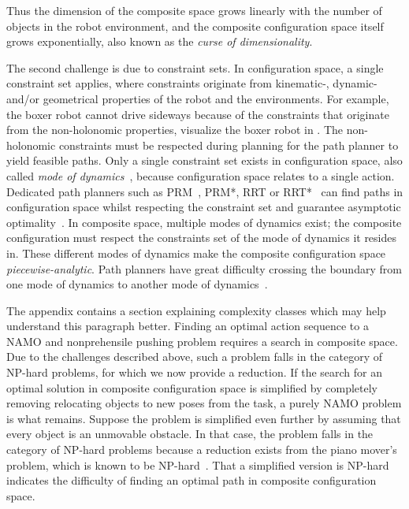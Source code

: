 Thus the dimension of the composite space grows linearly with the number of objects in the robot environment, and the composite configuration space itself grows exponentially, also known as the \textit{curse of dimensionality}.\bs

The second challenge is due to constraint sets. In configuration space, a single constraint set applies, where constraints originate from kinematic-, dynamic- and/or geometrical properties of the robot and the environments. For example, the boxer robot cannot drive sideways because of the constraints that originate from the non-holonomic properties, visualize the boxer robot in . The non-holonomic constraints must be respected during planning for the path planner to yield feasible paths. Only a single constraint set exists in configuration space, also called \textit{mode of dynamics}~\cite{hauser_multimodal_2010}, because configuration space relates to a single action. Dedicated path planners such as \ac{PRM}~\cite{hsu_path_1997}, \ac{PRM*}, \ac{RRT} or \ac{RRT*}~\cite{karaman_samplingbased_2011} can find paths in configuration space whilst respecting the constraint set and guarantee asymptotic optimality~\cite{karaman_samplingbased_2011}. In composite space, multiple modes of dynamics exist; the composite configuration must respect the constraints set of the mode of dynamics it resides in. These different modes of dynamics make the composite configuration space \textit{piecewise-analytic}. Path planners have great difficulty crossing the boundary from one mode of dynamics to another mode of dynamics~\cite{vega-brown_asymptotically_2020}.\bs

The appendix contains a section explaining complexity classes which may help understand this paragraph better. Finding an optimal action sequence to a \ac{NAMO} and nonprehensile pushing problem requires a search in composite space. Due to the challenges described above, such a problem falls in the category of \ac{NP-hard} problems, for which we now provide a reduction. If the search for an optimal solution in composite configuration space is simplified by completely removing relocating objects to new poses from the task, a purely \ac{NAMO} problem is what remains. Suppose the problem is simplified even further by assuming that every object is an unmovable obstacle. In that case, the problem falls in the category of \ac{NP-hard} problems because a reduction exists from the piano mover's problem, which is known to be \ac{NP-hard}~\cite{reif_motion_1985}. That a simplified version is \ac{NP-hard} indicates the difficulty of finding an optimal path in composite configuration space.\bs

